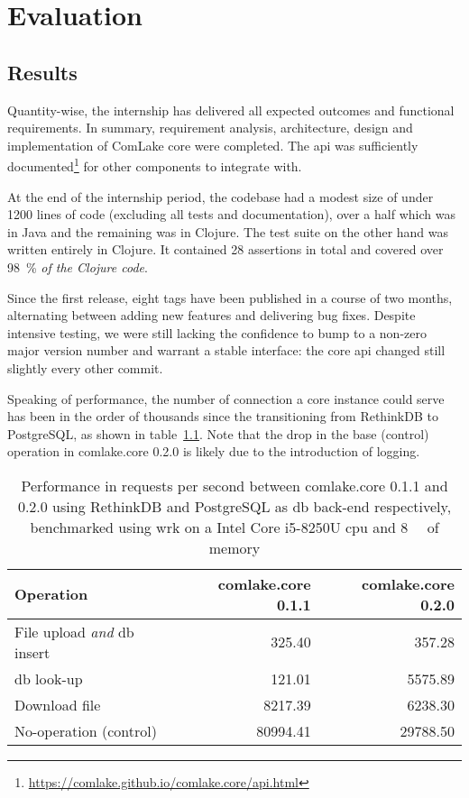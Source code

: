 \chapter{Evaluation}

\section{Results}
Quantity-wise, the internship has delivered
all expected outcomes and functional requirements.  In summary,
requirement analysis, architecture, design and implementation
of ComLake core were completed.  The \gls{api} was sufficiently
documented\footnote{\url{https://comlake.github.io/comlake.core/api.html}}
for other components to integrate with.

At the end of the internship period, the codebase had a modest size of under
1200 lines of code (excluding all tests and documentation), over a half which
was in Java and the remaining was in Clojure.  The test suite on the other hand
was written entirely in Clojure.  It contained 28 assertions in total
and covered over \SI{98}{\percent} \emph{of the Clojure code}.

Since the first release, eight tags have been published in a course
of two months, alternating between adding new features and delivering
bug fixes.  Despite intensive testing, we were still lacking the confidence
to bump to a non-zero major version number and warrant a stable interface:
the core \gls{api} changed still slightly every other commit.

Speaking of performance, the number of connection a core instance could serve
has been in the order of thousands since the transitioning from RethinkDB
to PostgreSQL, as shown in table~\ref{rdbpsql}.  Note that the drop in
the base (control) operation in comlake.core 0.2.0 is likely due to
the introduction of logging.
\begin{table}\centering
  \caption{Performance in requests per second between comlake.core 0.1.1
  and 0.2.0 using RethinkDB and PostgreSQL as \gls{db} back-end respectively,
  benchmarked using wrk on a Intel\textsuperscript{\tiny\textregistered}
  Core\textsuperscript{\tiny\texttrademark} i5-8250U \acrshort{cpu} and
  \SI{8}{\giga\byte} of memory}
  \begin{tabular}{l r r}
    \toprule
    Operation & comlake.core 0.1.1 & comlake.core 0.2.0\\
    \midrule
    File upload \emph{and} \gls{db} insert & 325.40 & 357.28\\
    \gls{db} look-up & 121.01 & 5575.89\\
    Download file & 8217.39 & 6238.30\\
    No-operation (control) & 80994.41 & 29788.50\\
    \bottomrule
  \end{tabular}
  \label{rdbpsql}
\end{table}

